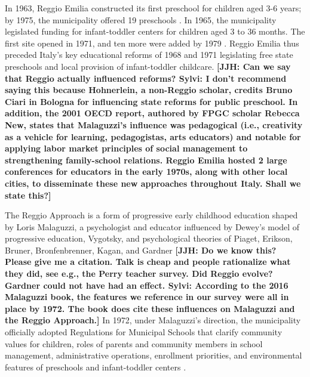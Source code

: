 In 1963, Reggio Emilia constructed its first preschool for children aged 3-6 years; by 1975, the municipality offered 19 preschools \citep{Hohnerlein_2009_Paradox-Public-Preschools}. In 1965, the municipality legislated funding for infant-toddler centers for children aged 3 to 36 months. The first site opened in 1971, and ten more were added by 1979 \citep{Cagliari-etal-eds_2016_BOOK_Loris-Malaguzzi}. Reggio Emilia thus preceded Italy's key educational reforms of 1968 and 1971 legislating free state preschools and local provision of infant-toddler childcare. \textbf{[JJH: Can we say that Reggio actually influenced reforms? Sylvi: I don't recommend saying this because Hohnerlein, a non-Reggio scholar, credits Bruno Ciari in Bologna for influencing state reforms for public preschool. In addition, the 2001 OECD report, authored by FPGC scholar Rebecca New, states that Malaguzzi's influence was pedagogical (i.e., creativity as a vehicle for learning, pedagogistas, arts educators) and notable for applying labor market principles of social management to strengthening family-school relations. Reggio Emilia hosted 2 large conferences for educators in the early 1970s, along with other local cities, to disseminate these new approaches throughout Italy. Shall we state this?]}

The Reggio Approach is a form of progressive early childhood education shaped by Loris Malaguzzi, a psychologist and educator influenced by Dewey's model of progressive education, Vygotsky, and psychological theories of Piaget, Erikson, Bruner, Bronfenbrenner, Kagan, and Gardner \citep{Rinaldi_2006_ReggioEmilia_BOOK,Cagliari-etal-eds_2016_BOOK_Loris-Malaguzzi.} \textbf{[JJH: Do we know this? Please give me a citation. Talk is cheap and people rationalize what they did, see e.g., the Perry teacher survey. Did Reggio evolve? Gardner could not have had an effect. Sylvi: According to the 2016 Malaguzzi book, the features we reference in our survey were all in place by 1972. The book does cite these influences on Malaguzzi and the Reggio Approach.]} In 1972, under Malaguzzi's direction, the municipality officially adopted Regulations for Municipal Schools that clarify community values for children, roles of parents and community members in school management, administrative operations, enrollment priorities, and environmental features of preschools and infant-toddler centers \citep{Giaroni_1972_Regulations-Municipal-EC-Schools}.

